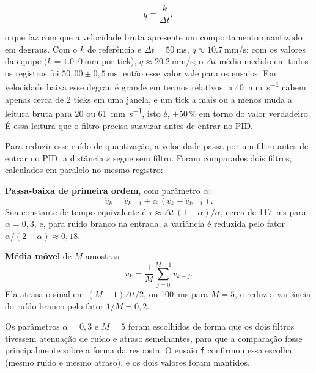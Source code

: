\documentclass[12pt]{article}
\begin{document}
\begin{equation}
    q = \frac{k}{\Delta t},
    \label{eq:resolucao_velocidade}
\end{equation}

o que faz com que a velocidade bruta apresente um comportamento quantizado em degraus. Com o $k$ de referência e $\Delta t = \SI{50}{\milli\second}$, $q \approx \SI{10,7}{\milli\meter\per\second}$; com os valores da equipe ($k = \SI{1,010}{\milli\meter}$ por tick), $q \approx \SI{20,2}{\milli\meter\per\second}$; o $\Delta t$ médio medido em todos os registros foi $50{,}00 \pm 0{,}5$\,ms, então esse valor vale para os ensaios. Em velocidade baixa esse degrau é grande em termos relativos: a \SI{40}{\milli\meter\per\second} cabem apenas cerca de 2 ticks em uma janela, e um tick a mais ou a menos muda a leitura bruta para 20 ou \SI{61}{\milli\meter\per\second}, isto é, $\pm$50\,\% em torno do valor verdadeiro. É essa leitura que o filtro precisa suavizar antes de entrar no PID.

Para reduzir esse ruído de quantização, a velocidade passa por um filtro antes de entrar no PID; a distância $s$ segue sem filtro. Foram comparados dois filtros, calculados em paralelo no mesmo registro:

\textbf{Passa-baixa de primeira ordem}, com parâmetro $\alpha$:
\begin{equation}
    \hat v_k = \hat v_{k-1} + \alpha\,(v_k - \hat v_{k-1}).
    \label{eq:passa_baixa}
\end{equation}
Sua constante de tempo equivalente é $\tau \approx \Delta t\,(1-\alpha)/\alpha$, cerca de \SI{117}{\milli\second} para $\alpha = 0{,}3$, e, para ruído branco na entrada, a variância é reduzida pelo fator $\alpha/(2-\alpha) \approx 0{,}18$.

\textbf{Média móvel} de $M$ amostras:
\begin{equation}
    \hat v_k = \frac{1}{M}\sum_{j=0}^{M-1} v_{k-j}.
    \label{eq:media_movel}
\end{equation}
Ela atrasa o sinal em $(M-1)\Delta t/2$, ou \SI{100}{\milli\second} para $M = 5$, e reduz a variância do ruído branco pelo fator $1/M = 0{,}2$.

Os parâmetros $\alpha = 0{,}3$ e $M = 5$ foram escolhidos de forma que os dois filtros tivessem atenuação de ruído e atraso semelhantes, para que a comparação fosse principalmente sobre a forma da resposta. O ensaio \texttt{f} confirmou essa escolha (mesmo ruído e mesmo atraso), e os dois valores foram mantidos.
\end{document}
